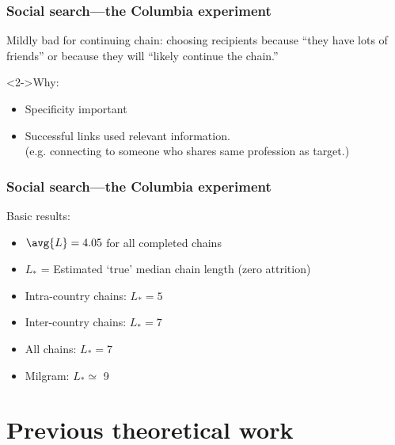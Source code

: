 \begin{frame}
  \frametitle{Social search---the Columbia experiment}

  \begin{block}{Mildly bad for continuing chain:}
    choosing recipients because 
    \alert{``they have lots of friends''}
    or because they will 
    \alert{``likely continue the chain.''}
  \end{block}

  \begin{block}<2->{Why:}
    \begin{itemize}
    \item<2-> 
      Specificity important
    \item<3-> 
      Successful links used relevant information.\\
      (e.g. connecting to someone who shares same profession as target.)
    \end{itemize}
  \end{block}

\end{frame}


%
%

\begin{frame}
  \frametitle{Social search---the Columbia experiment}
  \begin{block}{Basic results:}
    
    \begin{itemize}
    \item<1->
      $\avg{L} = 4.05$ for all completed chains
    \item<2->
      $L_\ast$ = Estimated `true' median chain length (zero attrition)
    \item<3->
      Intra-country chains: $L_\ast = 5$ 
    \item<4->
      Inter-country chains:
      $L_\ast = 7$ 
    \item<5->
      All chains:
      $L_\ast = 7$ 
    \item<6->
      Milgram:
      $L_\ast \simeq$ 9
    \end{itemize}
  \end{block}

\end{frame}

\section{Previous theoretical work}

